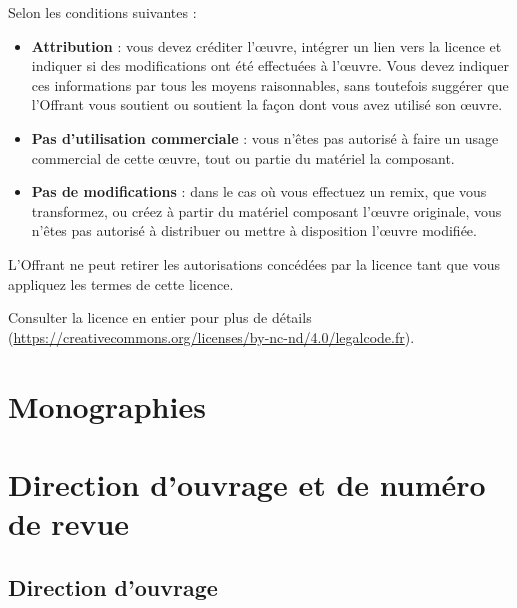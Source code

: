 \documentclass{article}
\begin{document}
\bigskip

    Selon les conditions suivantes :
    \begin{itemize}
        \item \textbf{Attribution} : vous devez créditer l'\oe{}uvre, intégrer un lien vers la licence et indiquer si des modifications ont été effectuées à l'\oe{}uvre. Vous devez indiquer ces informations par tous les moyens raisonnables, sans toutefois suggérer que l'Offrant vous soutient ou soutient la façon dont vous avez utilisé son \oe{}uvre.
        \item \textbf{Pas d'utilisation commerciale} : vous n'êtes pas autorisé à faire un usage commercial de cette \oe{}uvre, tout ou partie du matériel la composant. 
        \item \textbf{Pas de modifications} : dans le cas où vous effectuez un remix, que vous transformez, ou créez à partir du matériel composant l'\oe{}uvre originale, vous n'êtes pas autorisé à distribuer ou mettre à disposition l'\oe{}uvre modifiée. 
    \end{itemize}

\medskip

L'Offrant ne peut retirer les autorisations concédées par la licence tant que vous appliquez les termes de cette licence.

\medskip

    Consulter la licence en entier pour plus de détails (\url{https://creativecommons.org/licenses/by-nc-nd/4.0/legalcode.fr}). 

\newpage
\thispagestyle{empty}
\tableofcontents

\nocite{*}
\newpage

\section{Monographies}

\printbibliography[heading=subbibliography,keyword=monographie2019,heading=none]

\section{Direction d'ouvrage et de numéro de revue}

\subsection{Direction d'ouvrage}

\printbibliography[heading=subbibliography,keyword=dirouvrage2019,heading=none]
\end{document}
